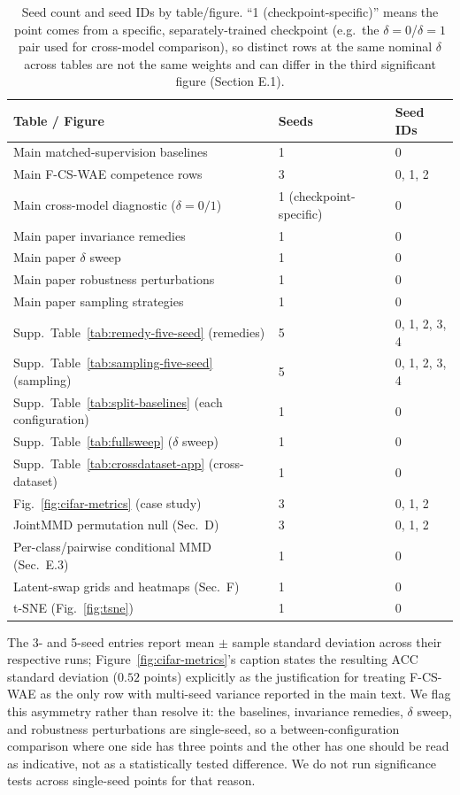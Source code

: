 \documentclass[letterpaper]{article}
\newcommand{\ours}{F-CS-WAE}
\begin{document}
\begin{table}[h]
\centering
\tiny
\setlength{\tabcolsep}{3pt}
\caption{Seed count and seed IDs by table/figure. ``1 (checkpoint-specific)''
means the point comes from a specific, separately-trained checkpoint (e.g.\
the $\delta{=}0$/$\delta{=}1$ pair used for cross-model comparison), so
distinct rows at the same nominal $\delta$ across tables are not the same
weights and can differ in the third significant figure (Section E.1).}
\label{tab:seedmap}
\begin{tabular}{lll}
\toprule
Table / Figure & Seeds & Seed IDs \\
\midrule
Main matched-supervision baselines & 1 & 0 \\
Main \ours{} competence rows & 3 & 0, 1, 2 \\
Main cross-model diagnostic ($\delta{=}0/1$) & 1 (checkpoint-specific) & 0 \\
Main paper invariance remedies & 1 & 0 \\
Main paper $\delta$ sweep & 1 & 0 \\
Main paper robustness perturbations & 1 & 0 \\
Main paper sampling strategies & 1 & 0 \\
Supp.\ Table~\ref{tab:remedy-five-seed} (remedies) & 5 & 0, 1, 2, 3, 4 \\
Supp.\ Table~\ref{tab:sampling-five-seed} (sampling) & 5 & 0, 1, 2, 3, 4 \\
Supp.\ Table~\ref{tab:split-baselines} (each configuration) & 1 & 0 \\
Supp.\ Table~\ref{tab:fullsweep} ($\delta$ sweep) & 1 & 0 \\
Supp.\ Table~\ref{tab:crossdataset-app} (cross-dataset) & 1 & 0 \\
Fig.~\ref{fig:cifar-metrics} (case study) & 3 & 0, 1, 2 \\
JointMMD permutation null (Sec.\ D) & 3 & 0, 1, 2 \\
Per-class/pairwise conditional MMD (Sec.\ E.3) & 1 & 0 \\
Latent-swap grids and heatmaps (Sec.\ F) & 1 & 0 \\
t-SNE (Fig.~\ref{fig:tsne}) & 1 & 0 \\
\bottomrule
\end{tabular}
\end{table}

The 3- and 5-seed entries report mean $\pm$ sample standard deviation across
their respective runs; Figure~\ref{fig:cifar-metrics}'s caption states the
resulting ACC standard deviation ($0.52$ points) explicitly as the justification for
treating \ours{} as the only row with multi-seed variance reported in the
main text. We flag this asymmetry rather than resolve it: the baselines,
invariance remedies, $\delta$ sweep, and robustness perturbations are
single-seed, so a between-configuration comparison where one side has three
points and the other has one should be read as indicative, not as a
statistically tested difference. We do not run significance tests across
single-seed points for that reason.
\end{document}
